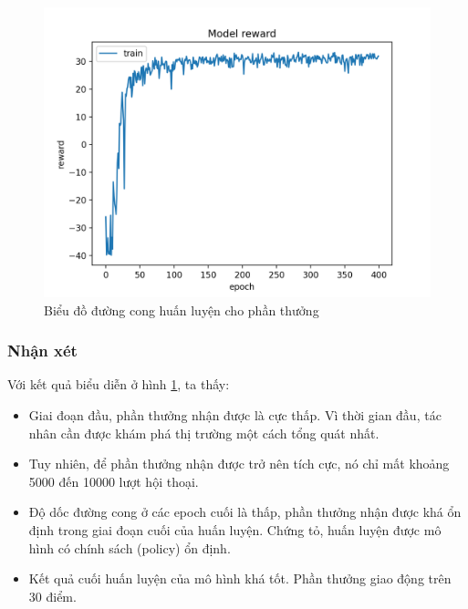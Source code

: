 \begin{center}
    \begin{figure}[ht!]
        \begin{center}
         \includegraphics[scale=0.95]{chapter7/img/rewardtrain.png}
        \end{center}
        \caption{Biểu đồ đường cong huấn luyện cho phần thưởng}
        \label{fig:rewardtrain}
    \end{figure}
\end{center}

\subsubsection{Nhận xét}
Với kết quả biểu diễn ở hình \ref{fig:rewardtrain}, ta thấy:

\begin{itemize}
    \item Giai đoạn đầu, phần thưởng nhận được là cực thấp. Vì thời gian đầu, tác nhân cần được khám phá thị trường một cách tổng quát nhất.
    \item Tuy nhiên, để phần thưởng nhận được trở nên tích cực, nó chỉ mất khoảng 5000 đến 10000 lượt hội thoại.
    \item Độ dốc đường cong ở các epoch cuối là thấp, phần thưởng nhận được khá ổn định trong giai đoạn cuối của huấn luyện. Chứng tỏ, huấn luyện được mô hình có chính sách (policy) ổn định.
    \item Kết quả cuối huấn luyện của mô hình khá tốt. Phần thưởng giao động trên 30 điểm.
\end{itemize}

